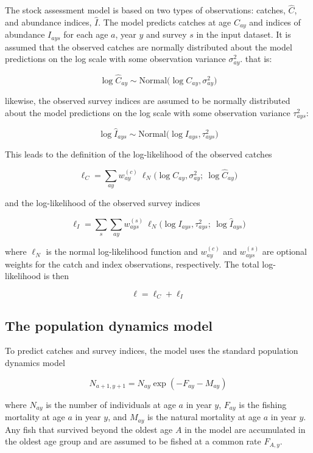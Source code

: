 \documentclass[
]{book}
\begin{document}
The stock assessment model is based on two types of observations: catches, \(\hat{C}\), and abundance indices, \(\hat{I}\). The model predicts catches at age \(C_{ay}\) and indices of abundance \(I_{ays}\) for each age \(a\), year \(y\) and survey \(s\) in the input dataset. It is assumed that the observed catches are normally distributed about the model predictions on the log scale with some observation variance \(\sigma^2_{ay}\). that is:

\[\log \hat{C}_{ay} \sim \text{Normal} \Big( \log C_{ay}, \sigma^2_{ay}\Big)\]

likewise, the observed survey indices are assumed to be normally distributed about the model predictions on the log scale with some observation variance \(\tau^2_{ays}\):

\[\log \hat{I}_{ays} \sim \text{Normal} \Big( \log I_{ays}, \tau^2_{ays} \Big)\]

This leads to the definition of the log-likelihood of the observed catches

\[\ell_C = \sum_{ay} w^{(c)}_{ay}\ \ell_N \Big( \log C_{ay}, \sigma^2_{ay} ;\ \log \hat{C}_{ay} \Big)\]

and the log-likelihood of the observed survey indices

\[\ell_I = \sum_s \sum_{ay} w^{(s)}_{ays}\ \ell_N \Big( \log I_{ays}, \tau_{ays}^2 ;\ \log \hat{I}_{ays} \Big)\]

where \(\ell_N\) is the normal log-likelihood function and \(w^{(c)}_{ay}\) and \(w^{(s)}_{ays}\) are optional weights for the catch and index observations, respectively. The total log-likelihood is then

\[\ell = \ell_C + \ell_I\]

\hypertarget{the-population-dynamics-model}{%
\subsection{The population dynamics model}\label{the-population-dynamics-model}}

To predict catches and survey indices, the model uses the standard population dynamics model

\[N_{a+1,y+1} = N_{ay} \exp \left( - F_{ay} - M_{ay} \right)\]

where \(N_{ay}\) is the number of individuals at age \(a\) in year \(y\), \(F_{ay}\) is the fishing mortality at age \(a\) in year \(y\), and \(M_{ay}\) is the natural mortality at age \(a\) in year \(y\). Any fish that survived beyond the oldest age \(A\) in the model are accumulated in the oldest age group and are assumed to be fished at a common rate \(F_{A,y}\).
\end{document}
